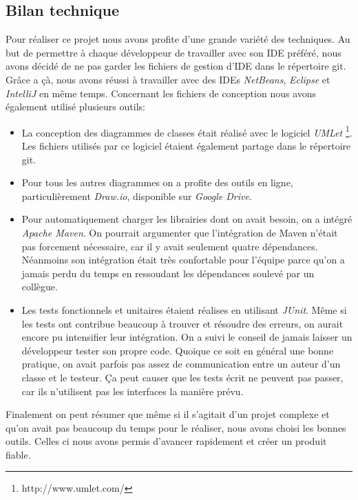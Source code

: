 \documentclass[10pt,a4paper]{book}
\begin{document}
\subsection{Bilan technique}
Pour réaliser ce projet nous avons profite d'une grande variété des techniques. Au but de permettre à chaque développeur de travailler avec son IDE préféré, nous avons décidé de ne pas garder les fichiers de gestion d'IDE dans le répertoire git. Grâce a çà, nous avons réussi à travailler avec des IDEs \textit{NetBeans}, \textit{Eclipse} et \textit{IntelliJ} en même temps. Concernant les fichiers de conception nous avons également utilisé plusieurs outils:
\begin{itemize}
	\item{La conception des diagrammes de classes était réalisé avec le logiciel \textit{UMLet} \footnote{http://www.umlet.com/}. Les fichiers utilisés par ce logiciel étaient également partage dans le répertoire git.}
	\item{Pour tous les autres diagrammes on a profite des outils en ligne, particulièrement \textit{Draw.io}, disponible sur \textit{Google Drive}.}
	\item{Pour automatiquement charger les librairies dont on avait besoin, on a intégré \textit{Apache Maven}. On pourrait argumenter que l'intégration de Maven n'était pas forcement nécessaire, car il y avait seulement quatre dépendances. Néanmoins son intégration était très confortable pour l'équipe parce qu'on a jamais perdu du temps en ressoudant les dépendances soulevé par un collègue.}
	\item{Les tests fonctionnels et unitaires étaient réalises en utilisant \textit{JUnit}. Même si les tests ont contribue beaucoup à trouver et résoudre des erreurs, on aurait encore pu intensifier leur intégration. On a suivi le conseil de jamais laisser un développeur tester son propre code. Quoique ce soit en général une bonne pratique, on avait parfois pas assez de communication entre un auteur d'un classe et le testeur. Ça peut causer que les tests écrit ne peuvent pas passer, car ils n'utilisent pas les interfaces la manière prévu.}
\end{itemize}
Finalement on peut résumer que même si il s'agitait d'un projet complexe et qu'on avait pas beaucoup du temps pour le réaliser, nous avons choisi les bonnes outils. Celles ci nous avons permis d'avancer rapidement et créer un produit fiable.
\appendix{}
\end{document}

